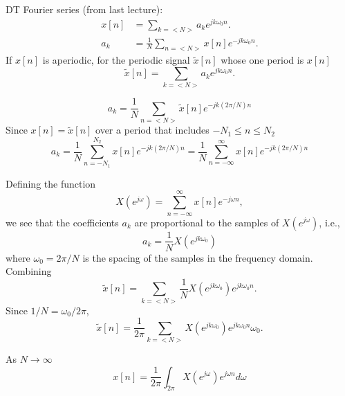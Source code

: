 \begin{frame}
	DT Fourier series (from last lecture):
    \begin{align*}
        x[n] &= \sum_{k=<N>} a_k e^{jk\omega_0 n}.\\
        a_k &= \frac{1}{N}\sum_{n=<N>} x[n]e^{-jk\omega_0 n}.
    \end{align*}
    If $x[n]$ is aperiodic, for the periodic signal $\tilde{x}[n]$ whose one period is $x[n]$
    \begin{equation*}
        \tilde{x}[n] = \sum_{k=<N>}  a_ke^{jk\omega_0 n}.
    \end{equation*}

    \begin{equation*}
        a_k = \frac{1}{N} \sum_{n=<N>}\tilde{x}[n]e^{-jk(2\pi/N) n}
    \end{equation*}
    Since $x[n] = \tilde{x}[n]$ over a period that includes $-N_1\leq n\leq N_2$
    \begin{equation*}
        a_k = \frac{1}{N} \sum_{n=-N_1}^{N_2}{x}[n]e^{-jk(2\pi/N) n} = \frac{1}{N} \sum_{n=-\infty}^{\infty}{x}[n]e^{-jk(2\pi/N) n}
    \end{equation*}
\end{frame}

\begin{frame}
    Defining the function
    \begin{equation*}
        X(e^{j\omega}) = \sum_{n=-\infty}^{\infty}x[n]e^{-j\omega n},
    \end{equation*}
    we see that the coefficients $a_k$ are proportional to the samples of $X(e^{j\omega})$, i.e.,
    \begin{equation*}
        a_k = \frac{1}{N} X(e^{jk\omega_0})
    \end{equation*}
    where $\omega_0 = 2\pi/N$ is the spacing of the samples in the frequency domain. Combining
    \begin{equation*}
        \tilde{x}[n] = \sum_{k=<N>}   \frac{1}{N} X(e^{jk\omega_0}) e^{jk\omega_0 n}.
    \end{equation*}
    Since $1/N = \omega_0/2\pi$,
    \begin{equation*}
        \tilde{x}[n] = \frac{1}{2\pi}\sum_{k=<N>}    X(e^{jk\omega_0}) e^{jk\omega_0 n}\omega_0.
    \end{equation*}

    As $N\longrightarrow \infty$
    \begin{equation*}
      x[n] = \frac{1}{2\pi}\int_{2\pi} X(e^{j\omega}) e^{j\omega n}d\omega
    \end{equation*}
\end{frame}

